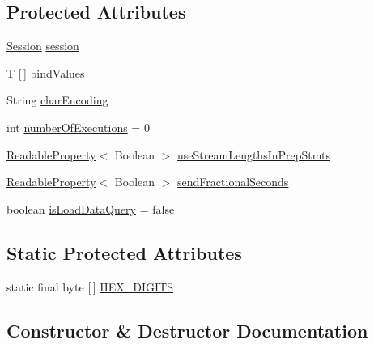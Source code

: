 \subsection*{Protected Attributes}
\begin{DoxyCompactItemize}
\item 
\mbox{\hyperlink{interfacecom_1_1mysql_1_1cj_1_1_session}{Session}} \mbox{\hyperlink{classcom_1_1mysql_1_1cj_1_1_abstract_query_bindings_aca9a8e582e3adb2d29ad562aa11bf3b5}{session}}
\item 
T \mbox{[}$\,$\mbox{]} \mbox{\hyperlink{classcom_1_1mysql_1_1cj_1_1_abstract_query_bindings_a89ff142df297b89a337489fe8f4e0266}{bind\+Values}}
\item 
String \mbox{\hyperlink{classcom_1_1mysql_1_1cj_1_1_abstract_query_bindings_aa77871b296799261f80d15a47b2b7b28}{char\+Encoding}}
\item 
int \mbox{\hyperlink{classcom_1_1mysql_1_1cj_1_1_abstract_query_bindings_afc729305171e8a1cf48109919d7a7e33}{number\+Of\+Executions}} = 0
\item 
\mbox{\hyperlink{interfacecom_1_1mysql_1_1cj_1_1conf_1_1_readable_property}{Readable\+Property}}$<$ Boolean $>$ \mbox{\hyperlink{classcom_1_1mysql_1_1cj_1_1_abstract_query_bindings_ac3e991801df757e24b6885db0c2301d8}{use\+Stream\+Lengths\+In\+Prep\+Stmts}}
\item 
\mbox{\hyperlink{interfacecom_1_1mysql_1_1cj_1_1conf_1_1_readable_property}{Readable\+Property}}$<$ Boolean $>$ \mbox{\hyperlink{classcom_1_1mysql_1_1cj_1_1_abstract_query_bindings_a4470ecf11f0d8b8f3ac3a5f4118f7350}{send\+Fractional\+Seconds}}
\item 
boolean \mbox{\hyperlink{classcom_1_1mysql_1_1cj_1_1_abstract_query_bindings_ae057e7a1b56daa198a730198f3040523}{is\+Load\+Data\+Query}} = false
\end{DoxyCompactItemize}
\subsection*{Static Protected Attributes}
\begin{DoxyCompactItemize}
\item 
static final byte \mbox{[}$\,$\mbox{]} \mbox{\hyperlink{classcom_1_1mysql_1_1cj_1_1_abstract_query_bindings_a99bfec5248e2cfa0e17827ebe33422db}{H\+E\+X\+\_\+\+D\+I\+G\+I\+TS}}
\end{DoxyCompactItemize}


\subsection{Constructor \& Destructor Documentation}
\mbox{\label{classcom_1_1mysql_1_1cj_1_1_abstract_query_bindings_a6e32b58cbbe788daf51ceb4b1dbab116}} 
